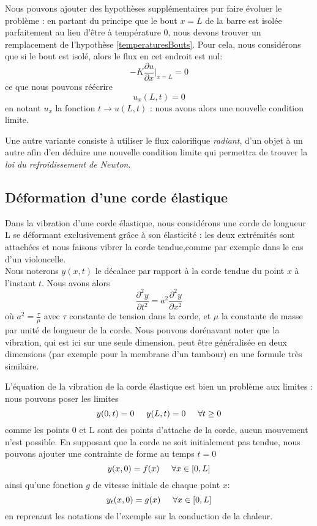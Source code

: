 \documentclass[12pt]{article}
\newcommand{\espace}{\hspace{5mm}}
\begin{document}
Nous pouvons ajouter des hypothèses supplémentaires pur faire évoluer le problème : 
en partant du principe que le bout $x=L$ de la barre est isolée parfaitement au lieu d'être à température 0, nous devons trouver un remplacement de l'hypothèse \eqref{temperaturesBouts}. Pour cela, nous considérons que si le bout est isolé, alors le flux en cet endroit est nul:
\begin{equation}
-K \frac{\partial u}{\partial x} |_{x=L} = 0
\end{equation}
ce que nous pouvons réécrire
\begin{equation}
u_x(L,t) = 0
\end{equation}
en notant $u_x$ la fonction $t \rightarrow u(L,t)$ : nous avons alors une nouvelle condition limite.

Une autre variante consiste à utiliser le flux calorifique \emph{radiant},  d'un objet à un autre afin d'en déduire une nouvelle condition limite qui permettra de trouver la \emph{loi du refroidissement de Newton}.

\subsection{Déformation d'une corde élastique}
Dans la vibration d'une corde élastique, nous considérons une corde de longueur L se déformant exclusivement grâce à son élasticité : les deux extrémités sont attachées et nous faisons vibrer la corde tendue,comme par exemple dans le cas d'un violoncelle.\\ 
Nous noterons $y(x,t)$ le décalace par rapport à la corde tendue du point $x$ à l'instant $t$. Nous avons alors 
\begin{equation} \label{eqVibration}
\frac{\partial^2 y}{\partial t^2} = a^2 \frac{\partial^2 y}{\partial x^2}
\end{equation}
où $a^2 = \frac{\tau}{\mu}$ avec $\tau$ constante de tension dans la corde, et $\mu$ la constante de masse par unité de longueur de la corde.
Nous pouvons dorénavant noter que la vibration, qui est ici sur une seule dimension, peut être généralisée en deux dimensions (par exemple pour la membrane d'un tambour) en une formule très similaire.

L'équation de la vibration de la corde élastique est bien un problème aux limites : nous pouvons poser les limites
\begin{equation}
y(0,t) = 0 \espace y(L,t) = 0 \espace \forall t \ge 0
\end{equation}
comme les points 0 et L sont des points d'attache de la corde, aucun mouvement n'est possible. En supposant que la corde ne soit  initialement pas tendue, nous pouvons ajouter une contrainte de forme au temps $t=0$
\begin{equation}
y(x,0) = f(x) \espace \forall x \in [0,L]
\end{equation}
ainsi qu'une fonction $g$ de vitesse initiale de chaque point $x$:
\begin{equation}
y_t(x,0) = g(x) \espace \forall x \in [0,L]
\end{equation}
en reprenant les notations de l'exemple sur la conduction de la chaleur.
\end{document}
